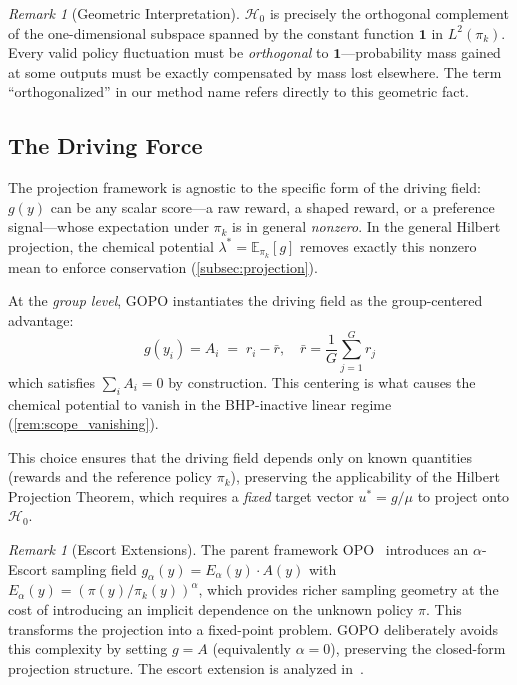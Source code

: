 \documentclass[11pt]{article}
\theoremstyle{definition}
\theoremstyle{remark}
\newtheorem{remark}[theorem]{Remark}
\newcommand{\E}{\mathbb{E}}
\newcommand{\pik}{\pi_k}
\begin{document}
\begin{remark}[Geometric Interpretation]
$\mathcal{H}_0$ is precisely the orthogonal complement of the one-dimensional subspace spanned by the constant function $\mathbf{1}$ in $L^2(\pik)$. Every valid policy fluctuation must be \emph{orthogonal} to $\mathbf{1}$---probability mass gained at some outputs must be exactly compensated by mass lost elsewhere. The term ``orthogonalized'' in our method name refers directly to this geometric fact.
\end{remark}

\subsection{The Driving Force}
\label{subsec:driving_force}

The projection framework is agnostic to the specific form of the driving field: $g(y)$ can be any scalar score---a raw reward, a shaped reward, or a preference signal---whose expectation under $\pik$ is in general \emph{nonzero}. In the general Hilbert projection, the chemical potential $\lambda^* = \E_{\pik}[g]$ removes exactly this nonzero mean to enforce conservation (\cref{subsec:projection}).

At the \emph{group level}, GOPO instantiates the driving field as the group-centered advantage:
\begin{equation}
\label{eq:driving}
    g(y_i) = A_i \;=\; r_i - \bar{r}, \quad \bar{r} = \frac{1}{G}\sum_{j=1}^{G} r_j
\end{equation}
which satisfies $\sum_i A_i = 0$ by construction. This centering is what causes the chemical potential to vanish in the BHP-inactive linear regime (\cref{rem:scope_vanishing}).

This choice ensures that the driving field depends only on known quantities (rewards and the reference policy $\pik$), preserving the applicability of the Hilbert Projection Theorem, which requires a \emph{fixed} target vector $u^* = g/\mu$ to project onto $\mathcal{H}_0$.

\begin{remark}[Escort Extensions]
The parent framework OPO~\cite{Wang2025OPO} introduces an $\alpha$-Escort sampling field $g_\alpha(y) = E_\alpha(y) \cdot A(y)$ with $E_\alpha(y) = (\pi(y)/\pik(y))^\alpha$, which provides richer sampling geometry at the cost of introducing an implicit dependence on the unknown policy $\pi$. This transforms the projection into a fixed-point problem. GOPO deliberately avoids this complexity by setting $g = A$ (equivalently $\alpha = 0$), preserving the closed-form projection structure. The escort extension is analyzed in~\cite{Wang2025OPO}.
\end{remark}
\end{document}
